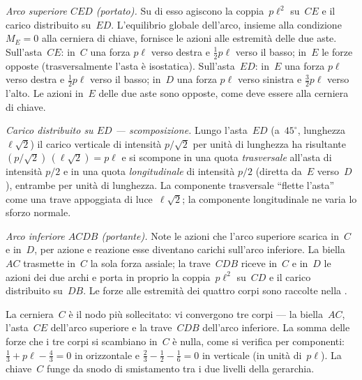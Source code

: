\medskip
\noindent\textit{Arco superiore $CED$ (portato).}
Su di esso agiscono la coppia~$p\ell^2$ su~$CE$ e il carico
distribuito su~$ED$. L'equilibrio globale dell'arco, insieme
alla condizione $M_E = 0$ alla cerniera di chiave, fornisce
le azioni alle estremità delle due aste. Sull'asta~$CE$:
in~$C$ una forza $p\ell$ verso destra e $\tfrac12 p\ell$
verso il basso; in~$E$ le forze opposte (trasversalmente
l'asta è isostatica). Sull'asta~$ED$: in~$E$ una forza
$p\ell$ verso destra e $\tfrac12 p\ell$ verso il basso;
in~$D$ una forza $p\ell$ verso sinistra e $\tfrac32 p\ell$
verso l'alto. Le azioni in~$E$ delle due aste sono opposte,
come deve essere alla cerniera di chiave.

\medskip
\noindent\textit{Carico distribuito su $ED$ --- scomposizione.}
Lungo l'asta~$ED$ (a~$45^\circ$, lunghezza~$\ell\sqrt2$) il
carico verticale di intensità $p/\!\sqrt2$ per unità di
lunghezza ha risultante $(p/\!\sqrt2)\,(\ell\sqrt2) = p\ell$
e si scompone in una quota \emph{trasversale} all'asta di
intensità $p/2$ e in una quota \emph{longitudinale} di
intensità $p/2$ (diretta da~$E$ verso~$D$), entrambe per
unità di lunghezza. La componente trasversale ``flette
l'asta'' come una trave appoggiata di luce~$\ell\sqrt2$; la
componente longitudinale ne varia lo sforzo normale.

\medskip
\noindent\textit{Arco inferiore $ACDB$ (portante).}
Note le azioni che l'arco superiore scarica in~$C$ e in~$D$,
per azione e reazione esse diventano carichi sull'arco
inferiore. La biella~$AC$ trasmette in~$C$ la sola forza
assiale; la trave~$CDB$ riceve in~$C$ e in~$D$ le azioni
dei due archi e porta in proprio la coppia~$p\ell^2$ su~$CD$
e il carico distribuito su~$DB$. Le forze alle estremità dei
quattro corpi sono raccolte nella
.

\begin{oss}
	La cerniera~$C$ è il nodo più sollecitato: vi convergono
	tre corpi --- la biella~$AC$, l'asta~$CE$ dell'arco
	superiore e la trave~$CDB$ dell'arco inferiore. La somma
	delle forze che i tre corpi si scambiano in~$C$ è nulla,
	come si verifica per componenti:
	$\tfrac13 + p\ell - \tfrac43 = 0$ in orizzontale e
	$\tfrac23 - \tfrac12 - \tfrac16 = 0$ in verticale
	(in unità di~$p\ell$). La chiave~$C$ funge da snodo di
	smistamento tra i due livelli della gerarchia.
\end{oss}


